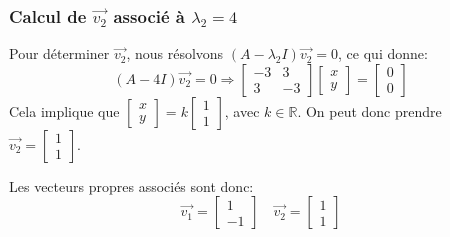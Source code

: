             \subsubsection{Calcul de $\overrightarrow{v_2}$ associé à $\lambda_2=4$}
                Pour déterminer $\overrightarrow{v_2}$, nous résolvons $(A - \lambda_2 I) \overrightarrow{v_2}=0$, ce qui donne:
                \begin{equation}
                    (A - 4 I) \overrightarrow{v_2}=0 \Rightarrow
                    \begin{bmatrix} -3 & 3 \\ 3 & -3 \end{bmatrix} 
                    \begin{bmatrix} x \\ y \end{bmatrix}=
                    \begin{bmatrix} 0 \\ 0 \end{bmatrix}
                \end{equation}
                Cela implique que $\begin{bmatrix} x \\ y \end{bmatrix}=k \begin{bmatrix} 1 \\ 1 \end{bmatrix}$, avec $k \in \mathbb{R}$. On peut donc prendre $\overrightarrow{v_2}=\begin{bmatrix} 1 \\ 1 \end{bmatrix}$.
                
            Les vecteurs propres associés sont donc:
            \begin{equation}
                \overrightarrow{v_1}=\begin{bmatrix} 1 \\ -1 \end{bmatrix} \quad
                \overrightarrow{v_2}=\begin{bmatrix} 1 \\ 1 \end{bmatrix}
            \end{equation}


